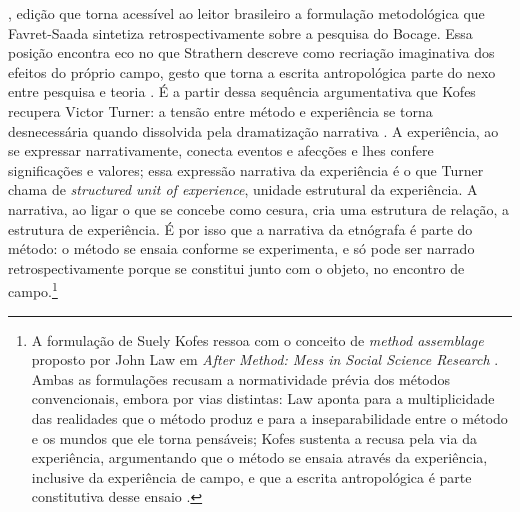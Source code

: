 {\parencite{FavretSaada2005SerAfetado}, edição que torna acessível ao leitor brasileiro a formulação metodológica que Favret-Saada sintetiza retrospectivamente sobre a pesquisa do Bocage.} Essa posição encontra eco no que Strathern descreve como recriação imaginativa dos efeitos do próprio campo, gesto que torna a escrita antropológica parte do nexo entre pesquisa e teoria \parencite[p.~299]{Kofes2015Maconaria}. É a partir dessa sequência argumentativa que Kofes recupera Victor Turner: a tensão entre método e experiência se torna desnecessária quando dissolvida pela dramatização narrativa \parencite[p.~301]{Kofes2015Maconaria}. A experiência, ao se expressar narrativamente, conecta eventos e afecções e lhes confere significações e valores; essa expressão narrativa da experiência é o que Turner chama de \textit{structured unit of experience}, unidade estrutural da experiência. A narrativa, ao ligar o que se concebe como cesura, cria uma estrutura de relação, a estrutura de experiência. É por isso que a narrativa da etnógrafa é parte do método: o método se ensaia conforme se experimenta, e só pode ser narrado retrospectivamente porque se constitui junto com o objeto, no encontro de campo.\footnote{A formulação de Suely Kofes ressoa com o conceito de \textit{method assemblage} proposto por John Law em \textit{After Method: Mess in Social Science Research} \parencite{Law2004After}. Ambas as formulações recusam a normatividade prévia dos métodos convencionais, embora por vias distintas: Law aponta para a multiplicidade das realidades que o método produz e para a inseparabilidade entre o método e os mundos que ele torna pensáveis; Kofes sustenta a recusa pela via da experiência, argumentando que o método se ensaia através da experiência, inclusive da experiência de campo, e que a escrita antropológica é parte constitutiva desse ensaio \parencite[pp.~298--299]{Kofes2015Maconaria}.}

